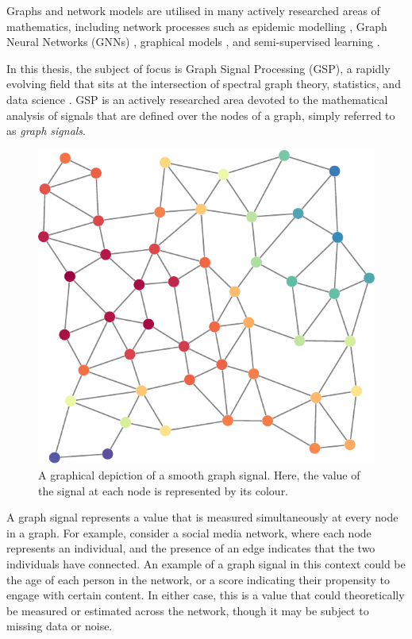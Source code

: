 Graphs and network models are utilised in many actively researched areas of mathematics, including network processes such as epidemic modelling \citep{Pare2020}, Graph Neural Networks (GNNs) \citep{Zhou2020}, graphical models \citep{Holmes2008}, and semi-supervised learning \citep{Chong2020}.

\vspace{0.1cm}

In this thesis, the subject of focus is Graph Signal Processing (GSP), a rapidly evolving field that sits at the intersection of spectral graph theory, statistics, and data science \citep{Ortega2018}. GSP is an actively researched area devoted to the mathematical analysis of signals that are defined over the nodes of a graph, simply referred to as \textit{graph signals}. \phantom{In this thesis we are  }

\newpage

\begin{figure}
	\centering
		\includegraphics[width=0.95\linewidth]{Figures/graph_signal_plot.pdf}
	\caption[A graphical depiction of a graph signal]{A graphical depiction of a smooth graph signal. Here, the value of the signal at each node is represented by its colour.}
	\label{fig:graph_signal}
\end{figure}
 

A graph signal represents a value that is measured simultaneously at every node in a graph. For example, consider a social media network, where each node represents an individual, and the presence of an edge indicates that the two individuals have connected. An example of a graph signal in this context could be the age of each person in the network, or a score indicating their propensity to engage with certain content. In either case, this is a value that could theoretically be measured or estimated across the network, though it may be subject to missing data or noise. 

